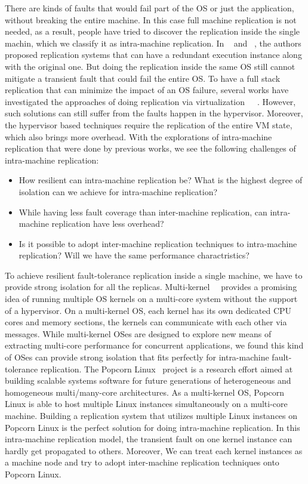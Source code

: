 There are kinds of faults that would fail part of the OS or just the application, without breaking the entire machine. In this case full machine replication is not needed, as a result, people have tried to discover the replication inside the single machin, which we classify it as intra-machine replication. In ~\cite{zhang2012runtime} and ~\cite{lee2010respec}, the authors proposed replication systems that can have a redundant execution instance along with the original one. But doing the replication inside the same OS still cannot mitigate a transient fault that could fail the entire OS. To have a full stack replication that can minimize the impact of an OS failure, several works have investigated the approaches of doing replication via virtualization~\cite{bressoud1996hypervisor}~\cite{lorch2015tardigrade}~\cite{dunlap2002revirt}. However, such solutions can still suffer from the faults happen in the hypervisor. Moreover, the hypervisor based techniques require the replication of the entire VM state, which also brings more overhead. With the explorations of intra-machine replication that were done by previous works, we see the following challenges of intra-machine replication:

\begin{itemize}
\item How resilient can intra-machine replication be? What is the highest degree of isolation can we achieve for intra-machine replication?
\item While having less fault coverage than inter-machine replication, can intra-machine replication have less overhead?
\item Is it possible to adopt inter-machine replication techniques to intra-machine replication? Will we have the same performance charactristics?
\end{itemize}

To achieve resilient fault-tolerance replication inside a single machine, we have to provide strong isolation for all the replicas. Multi-kernel~\cite{baumann2009multikernel}~\cite{barbalace2014popcorn} provides a promising idea of running multiple OS kernels on a multi-core system without the support of a hypervisor. On a multi-kernel OS, each kernel has its own dedicated CPU cores and memory sections, the kernels can communicate with each other via messages. While multi-kernel OSes are designed to explore new means of extracting multi-core performance for concurrent applications, we found this kind of OSes can provide strong isolation that fits perfectly for intra-machine fault-tolerance replication. The Popcorn Linux~\cite{barbalace2014popcorn} project is a research effort aimed at building scalable systems software for future generations of heterogeneous and homogeneous multi/many-core architectures. As a multi-kernel OS, Popcorn Linux is able to host multiple Linux instances simultaneously on a multi-core machine. Building a replication system that utilizes multiple Linux instances on Popcorn Linux is the perfect solution for doing intra-machine replication. In this intra-machine replication model, the transient fault on one kernel instance can hardly get propagated to others.
 Moreover, We can treat each kernel instances as a machine node and try to adopt inter-machine replication techniques onto Popcorn Linux.

